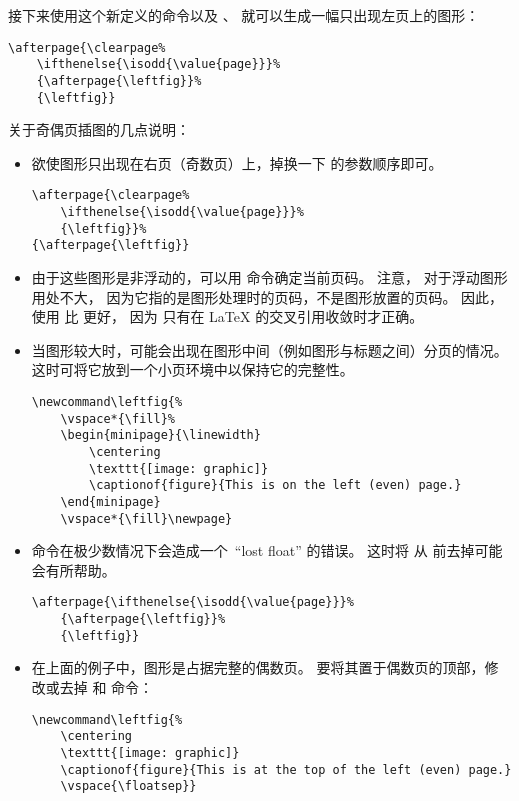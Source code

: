 接下来使用这个新定义的命令以及 、 就可以生成一幅只出现左页上的图形：
\begin{lstlisting}
\afterpage{\clearpage% 
	\ifthenelse{\isodd{\value{page}}}% 
	{\afterpage{\leftfig}}% 
	{\leftfig}}
\end{lstlisting}

关于奇偶页插图的几点说明：
\begin{itemize}
	\item 欲使图形只出现在右页（奇数页）上，掉换一下  的参数顺序即可。
\begin{lstlisting}
\afterpage{\clearpage% 
	\ifthenelse{\isodd{\value{page}}}% 
	{\leftfig}}%
{\afterpage{\leftfig}}
\end{lstlisting}
	\item 由于这些图形是非浮动的，可以用  命令确定当前页码。
	注意， 对于浮动图形用处不大，
	因为它指的是图形处理时的页码，不是图形放置的页码。
	因此，使用  比  更好，
	因为  只有在 \LaTeX{} 的交叉引用收敛时才正确。
	
	\item 当图形较大时，可能会出现在图形中间（例如图形与标题之间）分页的情况。
	这时可将它放到一个小页环境中以保持它的完整性。
\begin{lstlisting}
\newcommand\leftfig{%
	\vspace*{\fill}%
	\begin{minipage}{\linewidth}
		\centering
		\texttt{[image: graphic]}
		\captionof{figure}{This is on the left (even) page.}
	\end{minipage}
	\vspace*{\fill}\newpage}
\end{lstlisting}

	\item {} 命令在极少数情况下会造成一个~``lost float'' 的错误。
	这时将  从  前去掉可能会有所帮助。
\begin{lstlisting}
\afterpage{\ifthenelse{\isodd{\value{page}}}%
	{\afterpage{\leftfig}}%
	{\leftfig}}
\end{lstlisting}
	
	\item 在上面的例子中，图形是占据完整的偶数页。
	要将其置于偶数页的顶部，修改或去掉  和  命令：
\begin{lstlisting}
\newcommand\leftfig{%
	\centering
	\texttt{[image: graphic]}
	\captionof{figure}{This is at the top of the left (even) page.}
	\vspace{\floatsep}}
\end{lstlisting}

\end{itemize}

